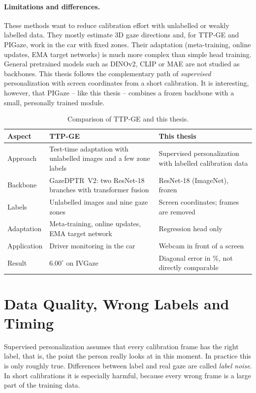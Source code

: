 \paragraph{Limitations and differences.}
These methods want to reduce calibration effort with unlabelled or weakly
labelled data. They mostly estimate 3D gaze directions and, for TTP-GE and
PIGaze, work in the car with fixed zones. Their adaptation (meta-training,
online updates, EMA target networks) is much more complex than simple head
training. General pretrained models such as DINOv2, CLIP or MAE are not studied
as backbones. This thesis follows the complementary path of \emph{supervised}
personalization with screen coordinates from a short calibration. It is
interesting, however, that PIGaze -- like this thesis -- combines a frozen
backbone with a small, personally trained module.

\begin{table}[htbp]
  \centering
  \small
  \caption{Comparison of TTP-GE and this thesis.}
  \label{tab:ttpge_vergleich}
  \begin{tabularx}{\textwidth}{L{3.0cm} Y Y}
    \toprule
    \textbf{Aspect} & \textbf{TTP-GE~\cite{nagpure2025ttpge}} & \textbf{This thesis} \\
    \midrule
    Approach & Test-time adaptation with unlabelled images and a few zone labels & Supervised personalization with labelled calibration data \\
    Backbone & GazeDPTR~V2: two ResNet-18 branches with transformer fusion & ResNet-18 (ImageNet), frozen \\
    Labels & Unlabelled images and nine gaze zones & Screen coordinates;  frames are removed \\
    Adaptation & Meta-training, online updates, EMA target network & Regression head only \\
    Application & Driver monitoring in the car & Webcam in front of a screen \\
    Result & $6.00^\circ$ on IVGaze & Diagonal error in \%, not directly comparable \\
    \bottomrule
  \end{tabularx}
\end{table}

\section{Data Quality, Wrong Labels and Timing}
\label{sec:label_noise}
Supervised personalization assumes that every calibration frame has the right
label, that is, the point the person really looks at in this moment. In
practice this is only roughly true. Differences between label and real gaze are
called \emph{label noise}. In short calibrations it is especially harmful,
because every wrong frame is a large part of the training data.

